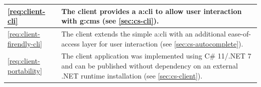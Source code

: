 \begin{table}[H]
\begin{tabular}{l|p{}}
        \ref{req:client-cli} & The client provides a \gls{a:cli} to allow user interaction with \gls{g:cms} (see \cref{sec:cs-cli}). \\ \hline
        \ref{req:client-firendly-cli} & The client extends the simple \gls{a:cli} with an additional ease-of-access layer for user interaction (see \cref{sec:cs-autocomplete}). \\ \hline
        \ref{req:client-portability} & The client application was implemented using C\# 11/.NET 7 and can be published without dependency on an external .NET runtime installation (see \cref{sec:cs-client}). \\
        \bottomrule
    \end{tabular}
\end{table}
\renewcommand{\arraystretch}{1}